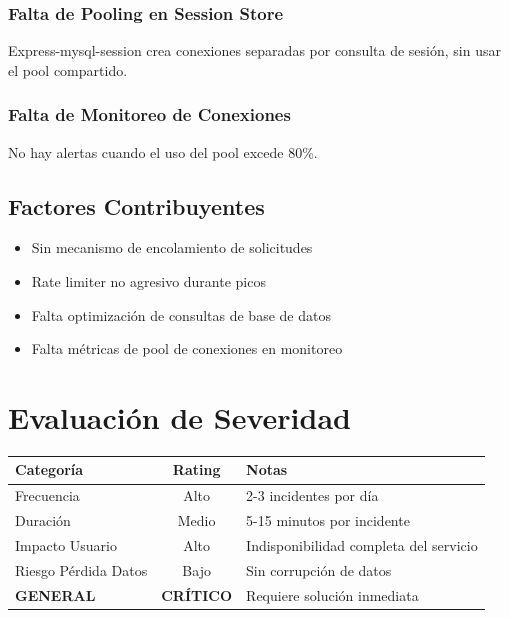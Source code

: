 \documentclass[12pt,a4paper]{article}
\begin{document}
\subsubsection{Falta de Pooling en Session Store}

Express-mysql-session crea conexiones separadas por consulta de sesión, sin usar el pool compartido.

\subsubsection{Falta de Monitoreo de Conexiones}

No hay alertas cuando el uso del pool excede 80\%.

\subsection{Factores Contribuyentes}

\begin{itemize}
    \item Sin mecanismo de encolamiento de solicitudes
    \item Rate limiter no agresivo durante picos
    \item Falta optimización de consultas de base de datos
    \item Falta métricas de pool de conexiones en monitoreo
\end{itemize}

\newpage

\section{Evaluación de Severidad}

\begin{table}[h]
\centering
\begin{tabular}{|l|c|p{8cm}|}
\toprule
\textbf{Categoría} & \textbf{Rating} & \textbf{Notas} \\
\midrule
Frecuencia & Alto & 2-3 incidentes por día \\
Duración & Medio & 5-15 minutos por incidente \\
Impacto Usuario & Alto & Indisponibilidad completa del servicio \\
Riesgo Pérdida Datos & Bajo & Sin corrupción de datos \\
\textbf{GENERAL} & \textbf{CRÍTICO} & Requiere solución inmediata \\
\bottomrule
\end{tabular}
\end{table}
\end{document}
